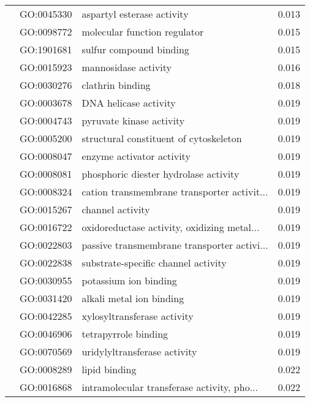 \begin{longtable}{lllr}
   & GO:0045330 &                   aspartyl esterase activity &         0.013 \\
   & GO:0098772 &                 molecular function regulator &         0.015 \\
   & GO:1901681 &                      sulfur compound binding &         0.015 \\
   & GO:0015923 &                         mannosidase activity &         0.016 \\
   & GO:0030276 &                             clathrin binding &         0.018 \\
   & GO:0003678 &                        DNA helicase activity &         0.019 \\
   & GO:0004743 &                     pyruvate kinase activity &         0.019 \\
   & GO:0005200 &       structural constituent of cytoskeleton &         0.019 \\
   & GO:0008047 &                    enzyme activator activity &         0.019 \\
   & GO:0008081 &        phosphoric diester hydrolase activity &         0.019 \\
   & GO:0008324 &  cation transmembrane transporter activit... &         0.019 \\
   & GO:0015267 &                             channel activity &         0.019 \\
   & GO:0016722 &  oxidoreductase activity, oxidizing metal... &         0.019 \\
   & GO:0022803 &  passive transmembrane transporter activi... &         0.019 \\
   & GO:0022838 &          substrate-specific channel activity &         0.019 \\
   & GO:0030955 &                        potassium ion binding &         0.019 \\
   & GO:0031420 &                     alkali metal ion binding &         0.019 \\
   & GO:0042285 &                  xylosyltransferase activity &         0.019 \\
   & GO:0046906 &                         tetrapyrrole binding &         0.019 \\
   & GO:0070569 &                 uridylyltransferase activity &         0.019 \\
   & GO:0008289 &                                lipid binding &         0.022 \\
   & GO:0016868 &  intramolecular transferase activity, pho... &         0.022 \\

\end{longtable}
